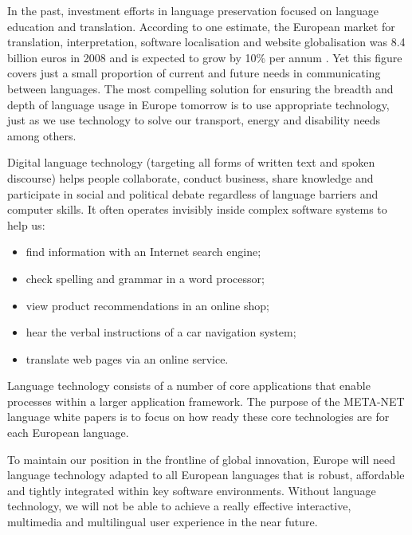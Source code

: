 \begin{multicols}{2}
In the past, investment efforts in language preservation focused on language education and translation. According to one estimate, the European market for translation, interpretation, software localisation and website globalisation was 8.4 billion euros in 2008 and is expected to grow by 10\% per annum \cite{EC-size}. Yet this figure covers just a small proportion of current and future needs in communicating between languages. The most compelling solution for ensuring the breadth and depth of language usage in Europe tomorrow is to use appropriate technology, just as we use technology to solve our transport, energy and disability needs among others.


Digital language technology (targeting all forms of written text and spoken discourse) helps people collaborate, conduct business, share knowledge and participate in social and political debate regardless of language barriers and computer skills. It often operates invisibly inside complex software systems to help us:

\begin{itemize}
\item find information with an Internet search engine;
\item check spelling and grammar in a word processor;
\item view product recommendations in an online shop;
\item hear the verbal instructions of a car navigation system;
\item translate web pages via an online service.
\end{itemize}

Language technology consists of a number of core applications that enable processes within a larger application framework. The purpose of the META-NET language white papers is to focus on how ready these core technologies are for each European language.  


To maintain our position in the frontline of global innovation, Europe will need language technology adapted to all European languages that is robust, affordable and tightly integrated within key software environments. Without language technology, we will not be able to achieve a really effective interactive, multimedia and multilingual user experience in the near future.


\end{multicols}
